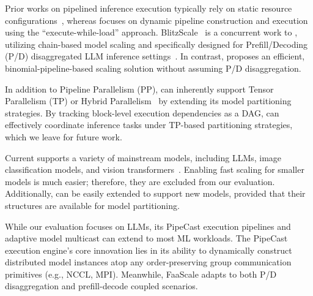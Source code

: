 Prior works on pipelined inference execution typically rely on static resource configurations~\cite{crankshaw_clipper,shen_nexus_2019,dhakal_gslice_2020,bai_pipeswitch_nodate,li_alpaserve_2023}, whereas \SysName focuses on dynamic pipeline construction and execution using the ``execute-while-load'' approach.
BlitzScale~\cite{BlitzScale} is a concurrent work to \SysName, utilizing chain-based model scaling and 
specifically designed for Prefill/Decoding (P/D) disaggregated LLM inference settings~\cite{zhong_distserve_2024}. 
In contrast, \SysName proposes an efficient, binomial-pipeline-based scaling solution without assuming P/D disaggregation. 



In addition to Pipeline Parallelism (PP), \SysName can inherently support Tensor Parallelism (TP) or Hybrid Parallelism~\cite{SpotServe,hybrid_parallel_survey} by extending its model partitioning strategies.
By tracking block-level execution dependencies as a DAG, \SysName can effectively coordinate inference tasks under TP-based partitioning strategies, which we leave for future work.


Current \SysName supports a variety of mainstream models, including LLMs, image classification models, and vision transformers~\cite{dpt-beit-large-512,clip-vit-large-patch14,metainf}.
Enabling fast scaling for smaller models is much easier; therefore, they are excluded from our evaluation. 
Additionally, \SysName can be easily extended to support new models, provided that their structures are available for model partitioning.

While our evaluation focuses on LLMs, its PipeCast execution pipelines and adaptive model multicast can extend to most ML workloads.
The PipeCast execution engine's core innovation lies in its ability to dynamically construct distributed model instances atop any order-preserving group communication primitives (e.g., NCCL, MPI). Meanwhile, FaaScale adapts to both P/D disaggregation and prefill-decode coupled scenarios. 

\fi



